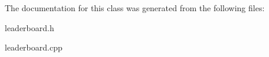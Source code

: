 The documentation for this class was generated from the following files\+:\begin{DoxyCompactItemize}
\item 
leaderboard.\+h\item 
leaderboard.\+cpp\end{DoxyCompactItemize}
